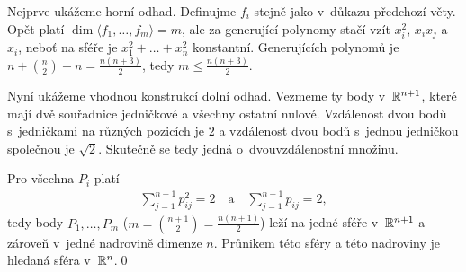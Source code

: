 \dk Nejprve ukážeme horní odhad. Definujme $f_i$ stejně jako v~důkazu předchozí věty. Opět platí $\dim\langle f_1,\dots,f_m\rangle=m$, ale za generující polynomy stačí vzít $x_i^2$, $x_ix_j$ a $x_i$, neboť na sféře je $x_1^2+\dots+x_n^2$ konstantní. Generujících polynomů je $n+\binom n2+n=\frac{n(n+3)}2$, tedy $m\leq\frac{n(n+3)}2$.

Nyní ukážeme vhodnou konstrukcí dolní odhad. Vezmeme ty body v~$\mathbb{R}^{n+1}$, které mají dvě souřadnice jedničkové a všechny ostatní nulové. Vzdálenost dvou bodů s~jedničkami na různých pozicích je $2$ a vzdálenost dvou bodů s~jednou jedničkou společnou je $\sqrt 2$. Skutečně se tedy jedná o~dvouvzdálenostní množinu.

Pro všechna $P_i$ platí
\begin{align}
\sum_{j=1}^{n+1}p_{ij}^2=2\quad\text{a}\quad\sum_{j=1}^{n+1}p_{ij}=2,
\end{align}
tedy body $P_1,\dots,P_m$ ($m=\binom{n+1}2=\frac{n(n+1)}2$) leží na jedné sféře v~$\mathbb{R}^{n+1}$ a zároveň v~jedné nadrovině dimenze $n$. Průnikem této sféry a této nadroviny je hledaná sféra v~$\mathbb{R}^n$.\qed